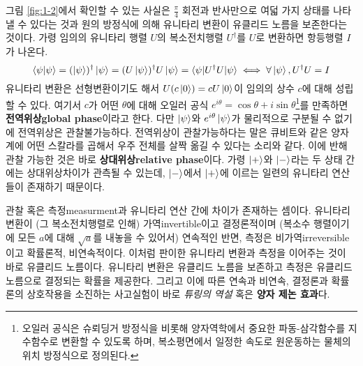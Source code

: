 \documentclass[a4paper,chapter,atbegshi]{oblivoir}
\begin{document}
그림 \ref{fig:1-2}에서 확인할 수 있는 사실은 $\frac{\pi}{4}$
회전과 반사만으로 여덟 가지 상태를 나타낼 수 있다는 것과 원의 방정식에 의해
유니타리 변환이 유클리드 노름을 보존한다는 것이다. 가령 임의의 유니타리 행렬
$U$의 복소전치행렬 $U^{\dagger}$를 $U$로 변환하면 항등행렬 $I$가 나온다.
\[
  \braket{\psi|\psi} = (\ket{\psi})^{\dagger}\ket{\psi} 
              = (U\ket{\psi})^{\dagger}U\ket{\psi}
              =\braket{\psi|U^{\dagger}U|\psi} 
  \iff\forall\ket{\psi},U^{\dagger}U= I
\]
유니타리 변환은 선형변환이기도 해서 $U(c\ket0)=cU\ket0$이 임의의 상수 $c$에 
대해 성립할 수 있다. 여기서 $c$가 어떤 $\theta$에 대해 오일러 공식 
$e^{i\theta}=\cos\theta+i\sin\theta$\footnote{오일러 공식은 슈뢰딩거
방정식을 비롯해 양자역학에서 중요한 파동-삼각함수를 지수함수로 변환할 수 있도록
하며, 복소평면에서 일정한 속도로 원운동하는 물체의 위치 방정식으로 정의된다.}를
만족하면 \textbf{전역위상\tiny global phase}이라고 한다. 다만 $\ket{\psi}$와 
$e^{i\theta}\ket{\psi}$가 물리적으로 구분될 수 없기에 전역위상은
관찰불가능하다. 전역위상이 관찰가능하다는 말은 큐비트와 같은
양자계에 어떤 스칼라를 곱해서 우주 전체를 살짝 옮길 수 있다는
소리와 같다. 이에 반해 관찰 가능한 것은 바로 \textbf{상대위상\tiny relative
phase}이다. 가령 $\ket+$와 $\ket-$라는 두 상태 간에는 상대위상차이가 관측될 수
있는데, $\ket-$에서 $\ket+$에 이르는 일련의 유니타리 연산들이 존재하기 때문이다.

관찰 혹은 측정{\tiny measurment}과 유니타리 연산 간에 차이가 존재하는
셈이다. 유니타리 변환이 (그 복소전치행렬로 인해) 가역{\tiny invertible}이고
결정론적이며 (복소수 행렬이기에 모든 $a$에 대해 $\sqrt{a}$를 내놓을 수 있어서)
연속적인 반면, 측정은 비가역{\tiny irreversible}이고 확률론적, 비연속적이다.
이처럼 판이한 유니타리 변환과 측정을 이어주는 것이 바로 유클리드 노름이다.
유니타리 변환은 유클리드 노름을 보존하고 측정은
유클리드 노름으로 결정되는 확률을 제공한다. 그리고 이에 따른 연속과 비연속,
결정론과 확률론의 상호작용을 소진하는 사고실험이 바로 \emph{튜링의
역설} 혹은 \textbf{양자 제논 효과}다.
\end{document}
